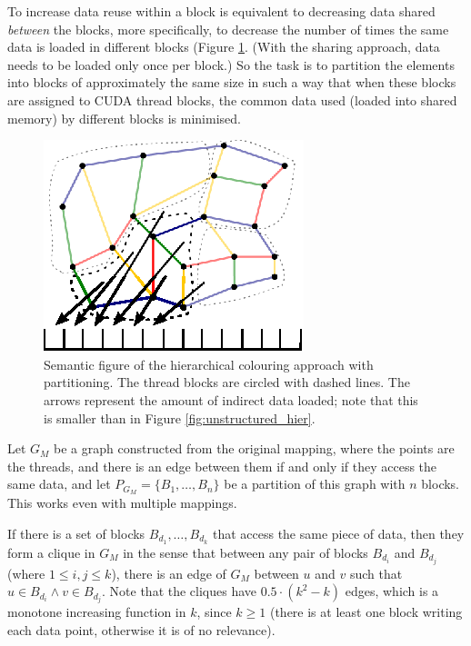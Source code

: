 To increase data reuse within a block is equivalent to decreasing data shared
\emph{between} the blocks, more specifically, to decrease the number of times
the same data is loaded in different blocks (Figure \ref{fig:unstructured_part}.
(With the sharing approach, data needs to be loaded only once per block.) So the
task is to partition the elements into blocks of approximately the same size in
such a way that when these blocks are assigned to CUDA thread blocks, the common
data used (loaded into shared memory) by different blocks is minimised.

\begin{figure}[Htpb]
  \centering
  \includegraphics{fig/svg/unstructured_part.eps}
  \caption{Semantic figure of the hierarchical colouring approach with
  partitioning. The thread blocks are circled with dashed lines. The arrows
  represent the amount of indirect data loaded; note that this is smaller than
  in Figure \ref{fig:unstructured_hier}.}
  \label{fig:unstructured_part}
\end{figure}

Let $G_M$ be a graph constructed from the original mapping, where the points are
the threads, and there is an edge between them if and only if they access the
same data, and let $P_{G_M} = \{B_1, \ldots, B_n\}$ be a partition of this graph
with $n$ blocks. This works even with multiple mappings.

If there is a set of blocks $B_{d_1}, \ldots, B_{d_k}$ that access the same
piece of data, then they form a clique in $G_M$ in the sense that between any
pair of blocks $B_{d_i}$ and $B_{d_j}$ (where $1 \le i,j \le k$), there is an
edge of $G_M$ between $u$ and $v$ such that $u \in B_{d_i} \wedge v \in
B_{d_j}$. Note that the cliques have $0.5 \cdot (k^2 - k)$ edges, which is a
monotone increasing function in $k$, since $k \ge 1$ (there is at least one
block writing each data point, otherwise it is of no relevance).

